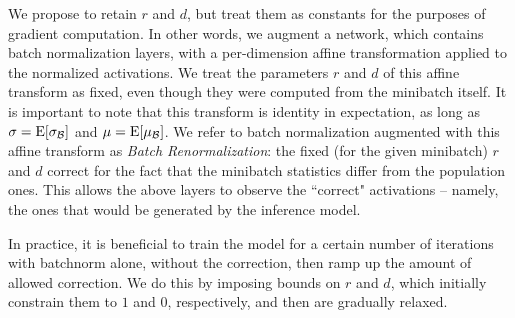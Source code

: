 We propose to retain $r$ and $d$, but treat them as constants for the purposes of gradient computation. In other words, we augment a  network, which contains batch normalization layers, with a per-dimension affine transformation applied to the normalized activations. We treat the parameters $r$ and $d$ of this affine transform as fixed, even though they were computed from the minibatch itself. It is important to note that this transform  is identity in expectation, as long as  $\sigma = \mathrm{E}[\sigma_{\mathcal{B}}]$ and $\mu=\mathrm{E}[\mu_{\mathcal{B}}]$. We refer to batch normalization augmented with this affine transform as {\em Batch Renormalization}: the fixed (for the given minibatch) $r$ and $d$ correct for the fact that the minibatch statistics differ from the population ones. This allows the above layers to observe the ``correct"  activations -- namely, the ones that would be generated by the inference model.

In practice, it is beneficial to train the model for a certain number of iterations with batchnorm alone, without the correction, then ramp up the amount of allowed correction. We do this by imposing bounds on $r$ and $d$, which initially constrain them to $1$ and $0$, respectively, and then are gradually relaxed.

